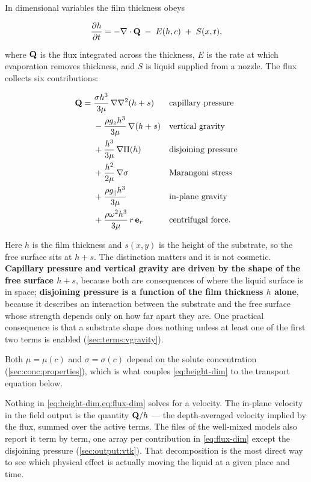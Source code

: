 In dimensional variables the film thickness obeys

\begin{equation}\label{eq:height-dim}
  \frac{\partial h}{\partial t} = -\nabla\cdot\mathbf{Q} \;-\; E(h,c) \;+\; S(x,t),
\end{equation}

where $\mathbf{Q}$ is the flux integrated across the thickness, $E$ is the rate at
which evaporation removes thickness, and $S$ is liquid supplied from a nozzle.
The flux collects six contributions:

\begin{equation}\label{eq:flux-dim}
  \begin{aligned}
    \mathbf{Q} = {}& \frac{\sigma h^{3}}{3\mu}\,\nabla\nabla^{2}(h+s)
      && \text{capillary pressure} \\
      &{}- \frac{\rho g_z h^{3}}{3\mu}\,\nabla(h+s)
      && \text{vertical gravity} \\
      &{}+ \frac{h^{3}}{3\mu}\,\nabla\Pi(h)
      && \text{disjoining pressure} \\
      &{}+ \frac{h^{2}}{2\mu}\,\nabla\sigma
      && \text{Marangoni stress} \\
      &{}+ \frac{\rho g_\parallel h^{3}}{3\mu}
      && \text{in-plane gravity} \\
      &{}+ \frac{\rho \omega^{2} h^{3}}{3\mu}\,r\,\mathbf{e}_r
      && \text{centrifugal force.}
  \end{aligned}
\end{equation}

Here $h$ is the film thickness and $s(x,y)$ is the height of the substrate, so
the free surface sits at $h+s$. The distinction matters and it is not
cosmetic. \textbf{Capillary pressure and vertical gravity are driven by the
shape of the free surface $h+s$}, because both are consequences of where the
liquid surface is in space; \textbf{disjoining pressure is a function of the
film thickness $h$ alone}, because it describes an interaction between the
substrate and the free surface whose strength depends only on how far apart
they are. One practical consequence is that a substrate shape does nothing
unless at least one of the first two terms is enabled
(\cref{sec:terms:vgravity}).

Both $\mu = \mu(c)$ and $\sigma = \sigma(c)$ depend on the solute
concentration (\cref{sec:conc:properties}), which is what couples
\cref{eq:height-dim} to the transport equation below.

\begin{note}
  Nothing in \cref{eq:height-dim,eq:flux-dim} solves for a velocity. The
  in-plane velocity in the field output is the quantity $\mathbf{Q}/h$ --- the
  depth-averaged velocity implied by the flux, summed over the active terms.
  The  files of the well-mixed models also report it term by term,
  one array per contribution in \cref{eq:flux-dim} except the disjoining
  pressure (\cref{sec:output:vtk}). That decomposition is the most direct way
  to see which physical effect is actually moving the liquid at a given place
  and time.
\end{note}

